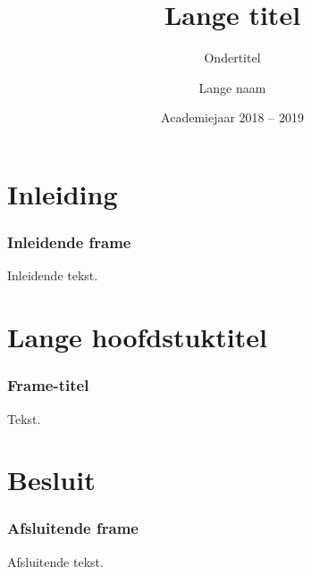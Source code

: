 \documentclass
   [kulak] %
   {kulakbeamer}
\title[Korte titel]{Lange titel}
\subtitle{Ondertitel}
\author[Korte naam]{Lange naam}
\institute[Kulak]{KU Leuven Kulak}
\date{Academiejaar 2018 -- 2019}
\begin{document}
\begin{titleframe}
\titlepage
\end{titleframe}

\begin{outlineframe}[Overzicht]
\tableofcontents
\end{outlineframe}


\section{Inleiding}

\begin{frame}
\frametitle{Inleidende frame}
Inleidende tekst.
\end{frame}

\section[Korte titel]{Lange hoofdstuktitel}

\begin{frame}
\frametitle{Frame-titel}
Tekst.
\end{frame}

\section{Besluit}
\begin{frame}
\frametitle{Afsluitende frame}
Afsluitende tekst.
\end{frame}
\end{document}
